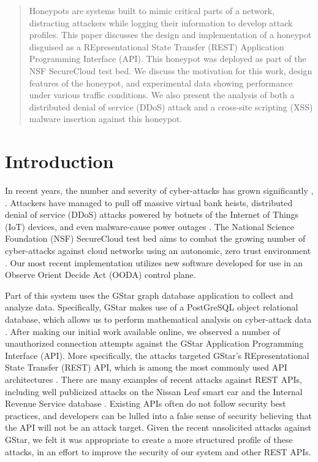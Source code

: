 \maketitle


\begin{abstract}
Honeypots are systems built to mimic critical parts of a network, distracting attackers while logging their information to develop attack profiles. This paper discusses the design and implementation of a honeypot disguised as a REpresentational State Transfer (REST) Application Programming Interface (API). This honeypot was deployed as part of the NSF SecureCloud test bed.  We discuss the motivation for this work, design features of the honeypot, and experimental data showing performance under various traffic conditions.  We also present the analysis of both a distributed denial of service (DDoS) attack and a cross-site scripting (XSS) malware insertion against this honeypot.
\end{abstract}

\IEEEpeerreviewmaketitle

\section{Introduction}
\label{intro}
In recent years, the number and severity of cyber-attacks has grown significantly \cite{Symantec-Threat-Report, IBM-XForce-Report}, \cite{IBM-XForce-Report}. Attackers have managed to pull off massive virtual bank heists, distributed denial of service (DDoS) attacks powered by botnets of the Internet of Things (IoT) devices, and even malware-cause power outages \cite{IBM-XForce-Report}. The National Science Foundation (NSF) SecureCloud test bed aims to combat the growing number of cyber-attacks against cloud networks using an autonomic, zero trust environment \cite{7796146}.  Our most recent implementation utilizes new software developed for use in an Observe Orient Decide Act (OODA) control plane.

Part of this system uses the GStar graph database application to collect and analyze data. Specifically, GStar makes use of a PostGreSQL object relational database, which allows us to perform mathematical analysis on cyber-attack data \cite{GStar}.  After making our initial work available online, we observed a number of unauthorized connection attempts against the GStar Application Programming Interface (API).  More specifically, the attacks targeted GStar's REpresentational State Transfer (REST) API, which is among the most commonly used API architectures \cite{REST-API-use}. There are many examples of recent attacks against REST APIs, including well publicized attacks on the Nissan Leaf smart car \cite{Nissan-Leaf} and the Internal Revenue Service database \cite{IRS}.  Existing APIs often do not follow security best practices, and developers can be lulled into a false sense of security believing that the API will not be an attack target.  Given the recent unsolicited attacks against GStar, we felt it was appropriate to create a more structured profile of these attacks, in an effort to improve the security of our system and other REST APIs.

